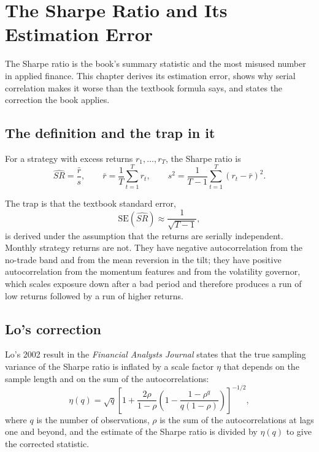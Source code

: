 
\chapter{The Sharpe Ratio and Its Estimation Error}
\label{ch:sharpe}

The Sharpe ratio is the book's summary statistic and the most misused
number in applied finance. This chapter derives its estimation error,
shows why serial correlation makes it worse than the textbook formula
says, and states the correction the book applies.

\section{The definition and the trap in it}

For a strategy with excess returns \(r_1, \dots, r_T\), the Sharpe ratio
is
\begin{equation}
\widehat{SR} = \frac{\bar{r}}{s},
\qquad
\bar{r} = \frac{1}{T}\sum_{t=1}^{T} r_t,
\qquad
s^2 = \frac{1}{T-1}\sum_{t=1}^{T}(r_t - \bar{r})^2.
\end{equation}

The trap is that the textbook standard error,
\begin{equation}
\mathrm{SE}(\widehat{SR}) \approx \frac{1}{\sqrt{T-1}},
\end{equation}
is derived under the assumption that the returns are serially independent.
Monthly strategy returns are not. They have negative autocorrelation from
the no-trade band and from the mean reversion in the tilt; they have
positive autocorrelation from the momentum features and from the
volatility governor, which scales exposure down after a bad period and
therefore produces a run of low returns followed by a run of higher
returns.

\section{Lo's correction}

Lo's 2002 result in the \emph{Financial Analysts Journal} states that the
true sampling variance of the Sharpe ratio is inflated by a scale factor
\(\eta\) that depends on the sample length and on the sum of the
autocorrelations:
\begin{equation}
\eta(q) = \sqrt{q}\left[1 + \frac{2\rho}{1-\rho}
  \left(1 - \frac{1-\rho^{q}}{q(1-\rho)}\right)\right]^{-1/2},
\end{equation}
where \(q\) is the number of observations, \(\rho\) is the sum of the
autocorrelations at lags one and beyond, and the estimate of the Sharpe
ratio is divided by \(\eta(q)\) to give the corrected statistic.

